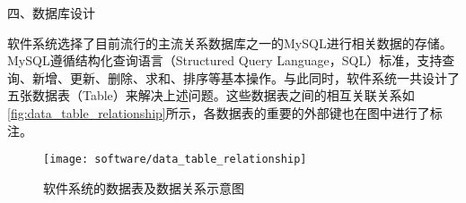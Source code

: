 四、数据库设计



软件系统选择了目前流行的主流关系数据库之一的MySQL进行相关数据的存储。MySQL遵循结构化查询语言（Structured Query Language，SQL）标准，支持查询、新增、更新、删除、求和、排序等基本操作。与此同时，软件系统一共设计了五张数据表（Table）来解决上述问题。这些数据表之间的相互关联关系如\autoref{fig:data_table_relationship}所示，各数据表的重要的外部键也在图中进行了标注。
\begin{figure}[htbp]
    \centering
    \texttt{[image: software/data\_table\_relationship]}
    \caption{\label{fig:data_table_relationship}软件系统的数据表及数据关系示意图}
\end{figure}

